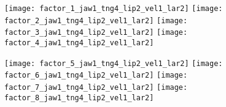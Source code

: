\documentclass[varwidth=7in]{standalone}
\begin{document}
\raggedright

\texttt{[image: factor\_1\_jaw1\_tng4\_lip2\_vel1\_lar2]}
\texttt{[image: factor\_2\_jaw1\_tng4\_lip2\_vel1\_lar2]}
\texttt{[image: factor\_3\_jaw1\_tng4\_lip2\_vel1\_lar2]}
\texttt{[image: factor\_4\_jaw1\_tng4\_lip2\_vel1\_lar2]}

\texttt{[image: factor\_5\_jaw1\_tng4\_lip2\_vel1\_lar2]}
\texttt{[image: factor\_6\_jaw1\_tng4\_lip2\_vel1\_lar2]}
\texttt{[image: factor\_7\_jaw1\_tng4\_lip2\_vel1\_lar2]}
\texttt{[image: factor\_8\_jaw1\_tng4\_lip2\_vel1\_lar2]}
\end{document}
